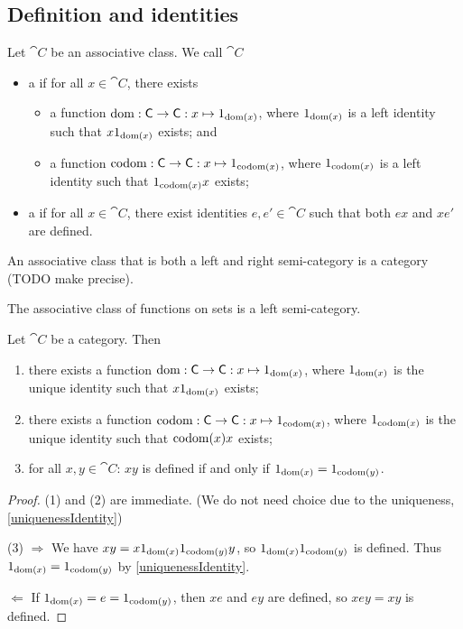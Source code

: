 \subsection{Definition and identities}
\begin{definition}
Let $\cat{C}$ be an associative class. We call $\cat{C}$
\begin{itemize}
\item a  if for all $x\in \cat{C}$, there exists
\begin{itemize}
\item a function $\operatorname{dom}: \mathsf{C}\to \mathsf{C}: x\mapsto 1_{\operatorname{dom}(x)}$, where $1_{\operatorname{dom}(x)}$ is a left identity such that $x1_{\operatorname{dom}(x)}$ exists; and
\item a function $\operatorname{codom}: \mathsf{C}\to \mathsf{C}: x\mapsto 1_{\operatorname{codom}(x)}$, where $1_{\operatorname{codom}(x)}$ is a left identity such that $1_{\operatorname{codom}(x)}x$ exists;
\end{itemize}
\item a  if for all $x\in \cat{C}$, there exist identities $e,e'\in \cat{C}$ such that both $ex$ and $xe'$ are defined.
\end{itemize}
\end{definition}

An associative class that is both a left and right semi-category is a category (TODO make precise).

\begin{example}
The associative class of functions on sets is a left semi-category.
\end{example}

\begin{lemma} \label{categoryIdentities}
Let $\cat{C}$ be a category. Then
\begin{enumerate}
\item there exists a function $\operatorname{dom}: \mathsf{C}\to \mathsf{C}: x\mapsto 1_{\operatorname{dom}(x)}$, where $1_{\operatorname{dom}(x)}$ is the unique identity such that $x1_{\operatorname{dom}(x)}$ exists;
\item there exists a function $\operatorname{codom}: \mathsf{C}\to \mathsf{C}: x\mapsto 1_{\operatorname{codom}(x)}$, where $1_{\operatorname{codom}(x)}$ is the unique identity such that $\operatorname{codom}(x)x$ exists;
\item for all $x,y\in \cat{C}$: $xy$ is defined \textup{if and only if} $1_{\operatorname{dom}(x)} = 1_{\operatorname{codom}(y)}$.
\end{enumerate}
\end{lemma}
\begin{proof}
(1) and (2) are immediate. (We do not need choice due to the uniqueness, \ref{uniquenessIdentity})

(3) $\Rightarrow$ We have $xy = x1_{\operatorname{dom}(x)}1_{\operatorname{codom}(y)}y$,
so $1_{\operatorname{dom}(x)}1_{\operatorname{codom}(y)}$ is defined. Thus $1_{\operatorname{dom}(x)} = 1_{\operatorname{codom}(y)}$ by \ref{uniquenessIdentity}.

$\Leftarrow$ If $1_{\operatorname{dom}(x)} = e = 1_{\operatorname{codom}(y)}$, then $xe$ and $ey$ are defined, so $xey = xy$ is defined.
\end{proof}


